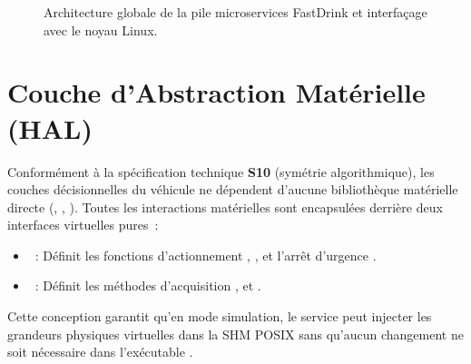 \begin{figure}[htbp]
\begin{tikzpicture}
\end{tikzpicture}
\caption{Architecture globale de la pile microservices FastDrink et interfaçage avec le noyau Linux.}
\label{fig:arch_globale}
\end{figure}

\section{Couche d'Abstraction Matérielle (HAL)}
Conformément à la spécification technique \textbf{S10} (symétrie algorithmique), les couches décisionnelles du véhicule ne dépendent d'aucune bibliothèque matérielle directe (, , ). 
Toutes les interactions matérielles sont encapsulées derrière deux interfaces virtuelles pures~:
\begin{itemize}
    \item {}~: Définit les fonctions d'actionnement , ,  et l'arrêt d'urgence .
    \item {}~: Définit les méthodes d'acquisition ,  et .
\end{itemize}
Cette conception garantit qu'en mode simulation, le service  peut injecter les grandeurs physiques virtuelles dans la SHM POSIX sans qu'aucun changement ne soit nécessaire dans l'exécutable .
